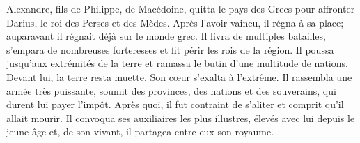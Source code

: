 Alexandre, fils de Philippe, de Macédoine, quitta le pays des Grecs
	pour affronter Darius, le roi des Perses et des Mèdes.
Après l’avoir vaincu, il régna à sa place; auparavant il régnait déjà sur le monde grec.
Il livra de multiples batailles, s’empara de nombreuses forteresses
	et fit périr les rois de la région.
Il poussa jusqu’aux extrémités de la terre et ramassa le butin d’une multitude de nations.
Devant lui, la terre resta muette.
	Son cœur s’exalta à l’extrême.
Il rassembla une armée très puissante,
	soumit des provinces, des nations et des souverains, qui durent lui payer l’impôt.
Après quoi, il fut contraint de s’aliter et comprit qu’il allait mourir.
Il convoqua ses auxiliaires les plus illustres, élevés avec lui depuis le jeune âge
	et, de son vivant, il partagea entre eux son royaume.
